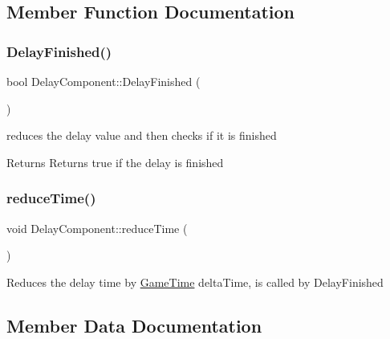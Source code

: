 \subsection{Member Function Documentation}
\mbox{\label{class_delay_component_a8942e663b1a92471ea79f0e7203d30bc}} 
\subsubsection{\texorpdfstring{Delay\+Finished()}{DelayFinished()}}
{\footnotesize\ttfamily bool Delay\+Component\+::\+Delay\+Finished (\begin{DoxyParamCaption}{ }\end{DoxyParamCaption})}



reduces the delay value and then checks if it is finished 

\begin{DoxyReturn}{Returns}
Returns true if the delay is finished 
\end{DoxyReturn}
\mbox{\label{class_delay_component_ac2c7023f723523ba2e42ae047d9b6092}} 
\subsubsection{\texorpdfstring{reduce\+Time()}{reduceTime()}}
{\footnotesize\ttfamily void Delay\+Component\+::reduce\+Time (\begin{DoxyParamCaption}{ }\end{DoxyParamCaption})\hspace{0.3cm}{\ttfamily [private]}}

Reduces the delay time by \hyperlink{class_game_time}{Game\+Time} delta\+Time, is called by Delay\+Finished 

\subsection{Member Data Documentation}
\mbox{\label{class_delay_component_a33d6e279ece1ab6197688c5916dad96d}} 
